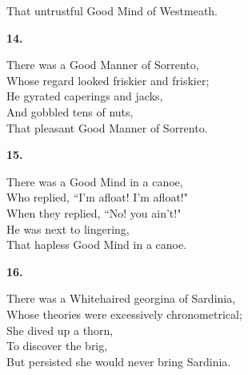 \documentclass{book}
\begin{document}
{\hspace*{14mm}       That untrustful Good Mind of Westmeath.
\begin{center}
\textbf{    14.}
\end{center}
\par
\noindent
\hspace*{14mm}       There was a Good Manner of Sorrento, \\
\hspace*{14mm}       Whose regard looked friskier and friskier; \\
\hspace*{14mm}       He gyrated caperings and jacks, \\
\hspace*{14mm}       And gobbled tens of nuts, \\
\hspace*{14mm}       That pleasant Good Manner of Sorrento.
\begin{center}
\textbf{    15.}
\end{center}
\par
\noindent
\hspace*{14mm}       There was a Good Mind in a canoe, \\
\hspace*{14mm}       Who replied, ``\textsc{I}'m afloat! \textsc{I}'m afloat!" \\
\hspace*{14mm}       When they replied, ``No! you ain't!" \\
\hspace*{14mm}       He was next to lingering, \\
\hspace*{14mm}       That hapless Good Mind in a canoe.
\begin{center}
\textbf{    16.}
\end{center}
\par
\noindent
\hspace*{14mm}       There was a Whitehaired georgina of Sardinia, \\
\hspace*{14mm}       Whose theories were excessively chronometrical; \\
\hspace*{14mm}       She dived up a thorn, \\
\hspace*{14mm}       To discover the brig, \\
\hspace*{14mm}       But persisted she would never bring Sardinia.
}
\end{document}

